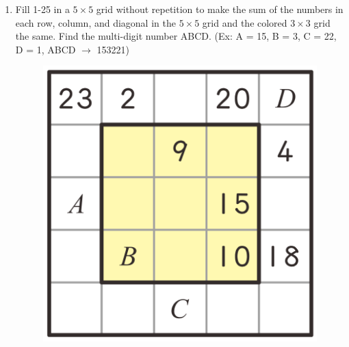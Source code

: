\documentclass[12pt]{scrartcl}
\begin{document}
\begin{enumerate}[resume]
    \hrulefill \item Fill 1-25 in a $5 \times 5$ grid without repetition to make the sum of the numbers in each row, column, and diagonal in the $5 \times 5$ grid and the colored $3 \times 3$ grid the same. Find the multi-digit number ABCD. (Ex: A = 15, B = 3, C = 22, D = 1, ABCD $\rightarrow$ 153221)
    \begin{figure}[h]
        \centering
        \includegraphics[scale=0.4]{StarGen/0Figure/wmi2023G6B-num10.png}
    \end{figure}

    \hrulefill
\end{enumerate}
\end{document}
